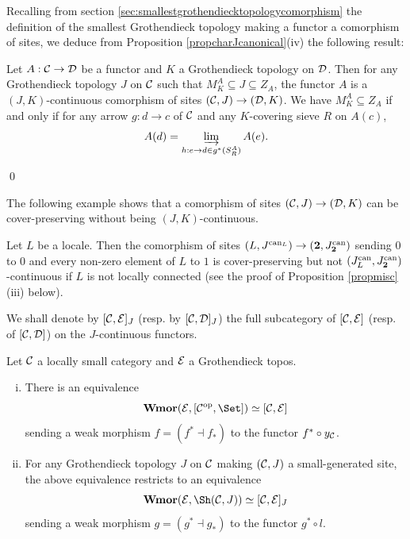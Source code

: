 \documentclass[a4paper,12pt]{article}
\begin{document}
Recalling from section \ref{sec:smallestgrothendiecktopologycomorphism} the definition of the smallest Grothendieck topology making a functor a comorphism of sites, we deduce from Proposition \ref{propcharJcanonical}(iv) the following result:

\begin{proposition}
	Let $A:{\cal C}\to {\cal D}$ be a functor and $K$ a Grothendieck topology on $\cal D$. Then for any Grothendieck topology $J$ on $\cal C$ such that $M^{A}_{K}\subseteq J\subseteq Z_{A}$, the functor $A$ is a $(J, K)$-continuous comorphism of sites $({\cal C}, J)\to ({\cal D}, K)$. 
	We have $M^{A}_{K}\subseteq Z_{A}$ if and only if for any arrow $g:d\to c$ of $\cal C$ and any $K$-covering sieve $R$ on $A(c)$, 
	\[
	A(d)=\varinjlim_{h:e\to d \in g^{\ast}(S^{A}_{R})} A(e).
	\] 	   
\end{proposition}\qed 

The following example shows that a comorphism of sites $({\cal C}, J) \to  ({\cal D}, K)$ can be cover-preserving without being $(J, K)$-continuous.

\begin{example}
	Let $L$ be a locale. Then the comorphism of sites $(L, J^{\textup{can}_{L}})\to (\textbf{2}, J^{\textup{can}}_{\textbf{2}})$ sending $0$ to $0$ and every non-zero element of $L$ to $1$ is cover-preserving but not $(J^{\textup{can}}_{L}, J^{\textup{can}}_{\textbf{2}})$-continuous if $L$ is not locally connected (see the proof of Proposition \ref{propmisc}(iii) below).     
\end{example}

We shall denote by $[{\cal C}, {\cal E}]_{J}$ (resp. by $[{\cal C}, {\cal D}]_{J}$) the full subcategory of $[{\cal C}, {\cal E}]$ (resp. of $[{\cal C}, {\cal D}]$) on the $J$-continuous functors.

\begin{proposition}\label{propweakmorphismequivalence}
	Let $\cal C$ a locally small category and $\cal E$ a Grothendieck topos. 
	\begin{enumerate}[(i)]
		\item There is an equivalence
		\[
		\textup{\bf Wmor}({\cal E}, [{\cal C}^{\textup{op}}, \Set])\simeq [{\cal C}, {\cal E}]
		\]
		sending a weak morphism $f=(f^{\ast}\dashv f_{\ast})$ to the functor $f^{\ast}\circ y_{\cal C}$.
		
		\item For any Grothendieck topology $J$ on $\cal C$ making $({\cal C}, J)$ a small-generated site, the above equivalence restricts to an equivalence
		\[
		\textup{\bf Wmor}({\cal E}, \Sh({\cal C}, J))\simeq [{\cal C}, {\cal E}]_{J}
		\]
		sending a weak morphism $g=(g^{\ast}\dashv g_{\ast})$ to the functor $g^{\ast}\circ l$.
	\end{enumerate}
\end{proposition}
\end{document}
